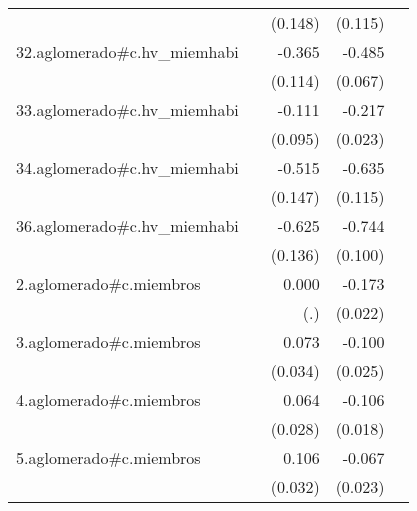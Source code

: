 {\begin{longtable}{l*{4}{D{.}{.}{-1}}}
            &                     &     (0.148)         &     (0.115)         &                     \\
\addlinespace
32.aglomerado#c.hv\_miemhabi&                     &      -0.365\sym{**} &      -0.485\sym{***}&                     \\
            &                     &     (0.114)         &     (0.067)         &                     \\
\addlinespace
33.aglomerado#c.hv\_miemhabi&                     &      -0.111         &      -0.217\sym{***}&                     \\
            &                     &     (0.095)         &     (0.023)         &                     \\
\addlinespace
34.aglomerado#c.hv\_miemhabi&                     &      -0.515\sym{***}&      -0.635\sym{***}&                     \\
            &                     &     (0.147)         &     (0.115)         &                     \\
\addlinespace
36.aglomerado#c.hv\_miemhabi&                     &      -0.625\sym{***}&      -0.744\sym{***}&                     \\
            &                     &     (0.136)         &     (0.100)         &                     \\
\addlinespace
2.aglomerado#c.miembros&                     &       0.000         &      -0.173\sym{***}&                     \\
            &                     &         (.)         &     (0.022)         &                     \\
\addlinespace
3.aglomerado#c.miembros&                     &       0.073\sym{*}  &      -0.100\sym{***}&                     \\
            &                     &     (0.034)         &     (0.025)         &                     \\
\addlinespace
4.aglomerado#c.miembros&                     &       0.064\sym{*}  &      -0.106\sym{***}&                     \\
            &                     &     (0.028)         &     (0.018)         &                     \\
\addlinespace
5.aglomerado#c.miembros&                     &       0.106\sym{**} &      -0.067\sym{**} &                     \\
            &                     &     (0.032)         &     (0.023)         &                     \\

\end{longtable}}
